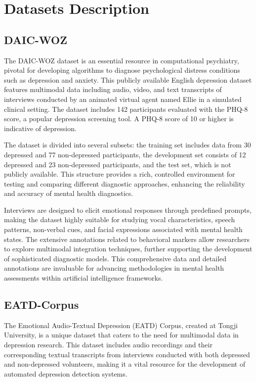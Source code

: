 \section{Datasets Description}
\subsection{DAIC-WOZ}
The DAIC-WOZ dataset is an essential resource in computational psychiatry, pivotal for developing algorithms to diagnose psychological distress conditions such as depression and anxiety. This publicly available English depression dataset features multimodal data including audio, video, and text transcripts of interviews conducted by an animated virtual agent named Ellie in a simulated clinical setting. The dataset includes 142 participants evaluated with the PHQ-8 score\cite{phq8}, a popular depression screening tool. A PHQ-8 score of 10 or higher is indicative of depression.

The dataset is divided into several subsets: the training set includes data from 30 depressed and 77 non-depressed participants, the development set consists of 12 depressed and 23 non-depressed participants, and the test set, which is not publicly available. This structure provides a rich, controlled environment for testing and comparing different diagnostic approaches, enhancing the reliability and accuracy of mental health diagnostics.

Interviews are designed to elicit emotional responses through predefined prompts, making the dataset highly suitable for studying vocal characteristics, speech patterns, non-verbal cues, and facial expressions associated with mental health states. The extensive annotations related to behavioral markers allow researchers to explore multimodal integration techniques, further supporting the development of sophisticated diagnostic models. This comprehensive data and detailed annotations are invaluable for advancing methodologies in mental health assessments within artificial intelligence frameworks.
\subsection{EATD-Corpus}
The Emotional Audio-Textual Depression (EATD) Corpus, created at Tongji University, is a unique dataset that caters to the need for multimodal data in depression research. This dataset includes audio recordings and their corresponding textual transcripts from interviews conducted with both depressed and non-depressed volunteers, making it a vital resource for the development of automated depression detection systems.

